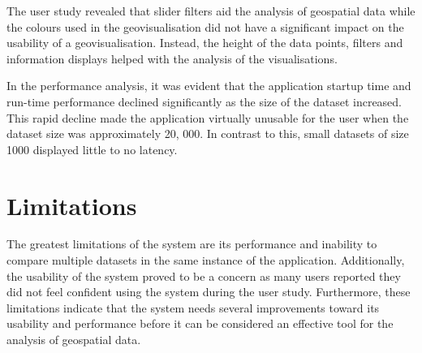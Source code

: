 {	%
	The user study revealed that slider filters aid the analysis of geospatial data while the colours used in the geovisualisation did not have a significant impact on the usability of a geovisualisation. Instead, the height of the data points, filters and information displays helped with the analysis of the visualisations. 

	In the performance analysis, it was evident that the application startup time and run-time performance declined significantly as the size of the dataset increased. This rapid decline made the application virtually unusable for the user when the dataset size was approximately 20, 000. In contrast to this, small datasets of size 1000 displayed little to no latency.


}

\section{Limitations} {
\label{sec:limitations}
	
	The greatest limitations of the system are its performance and inability to compare multiple datasets in the same instance of the application. Additionally, the usability of the system proved to be a concern as many users reported they did not feel confident using the system during the user study. Furthermore, these limitations indicate that the system needs several improvements toward its usability and performance before it can be considered an effective tool for the analysis of geospatial data.

}


